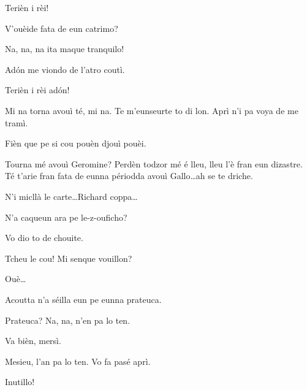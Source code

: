 \begin{drama}
\Tuenospeaks Terièn i rèi!

\Spritzspeaks{} V'ouèide fata de eun catrimo?

\Tcheuttespeaks Na, na, na ita maque tranquilo!

\Spritzspeaks Ad\'on me viondo de l'atro coutì.


\Tuenospeaks Terièn i rèi ad\'on!


\Gerominespeaks Mi na torna avouì té, mi na. Te m'eunseurte to di lon. Aprì n'i pa voya de me tramì.

\Saventaspeaks Fièn que pe si cou pouèn djouì pouèi.

\Richardspeaks Tourna mé avouì Geromine? Perdèn todzor mé é lleu, lleu l'è fran eun dizastre. Té t'arie fran fata de eunna périodda avouì Gallo\ldots ah se te driche.

\Tuenospeaks N'i micllà le carte\ldots Richard coppa\ldots





\Genespeaks{} N'a caqueun ara pe le-z-ouficho?

\Sandrinospeaks Vo dio to de chouite.


\Tuenospeaks Tcheu le cou! Mi senque vouillon?


\Tuenospeaks Ouè\ldots

\Sandrinospeaks Acoutta n'a séilla eun pe eunna prateuca.

\Tuenospeaks Prateuca? Na, na, n'en pa lo ten.

\Sandrinospeaks Va bièn, mersì.


\Sandrinospeaks{} Mesieu, l'an pa lo ten. Vo fa pasé aprì.

\Genespeaks{} Inutillo!


\end{drama}
